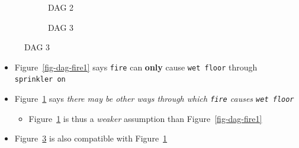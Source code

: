 \documentclass[
  letterpaper,
  DIV=11,
  numbers=noendperiod]{scrartcl}
\providecommand{\tightlist}{%
  \setlength{\itemsep}{0pt}\setlength{\parskip}{0pt}}\usepackage{longtable,booktabs,array}
\begin{document}
\begin{figure}
\begin{minipage}{0.33\linewidth}
\begin{figure}[H]
{}

\caption{\label{fig-dag-fire2}DAG 2}

\end{figure}%

\end{minipage}%
%
\begin{minipage}{0.33\linewidth}

\begin{figure}[H]


\caption{\label{fig-dag-fire3}DAG 3}

\end{figure}%

\end{minipage}%

\end{figure}%

\begin{itemize}
\tightlist
\item
  Figure~\ref{fig-dag-fire1} says \texttt{fire} can \textbf{only} cause
  \texttt{wet\ floor} through \texttt{sprinkler\ on}
\item
  Figure~\ref{fig-dag-fire2} says \emph{there may be other ways through
  which \texttt{fire} causes \texttt{wet\ floor}}

  \begin{itemize}
  \tightlist
  \item
    Figure~\ref{fig-dag-fire2} is thus a \emph{weaker} assumption than
    Figure~\ref{fig-dag-fire1}
  \end{itemize}
\item
  Figure~\ref{fig-dag-fire3} is also compatible with
  Figure~\ref{fig-dag-fire2}
\end{itemize}
\end{document}
